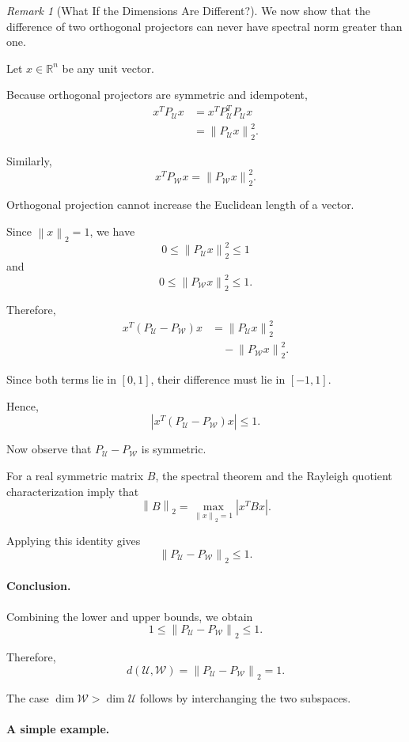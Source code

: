 \documentclass[14pt,letterpaper]{article}
\theoremstyle{plain}
\theoremstyle{definition}
\theoremstyle{remark}
\newtheorem{remark}[theorem]{Remark}
\newcommand{\R}{\mathbb{R}}
\newcommand{\norm}[1]{\left\lVert #1 \right\rVert}
\newcommand{\abs}[1]{\left| #1 \right|}
\begin{document}
\begin{remark}[What If the Dimensions Are Different?]
We now show that the difference of two
orthogonal projectors can never have
spectral norm greater than one.

Let $x\in\R^n$ be any unit vector.

Because orthogonal projectors are symmetric
and idempotent,
\[
\begin{aligned}
x^TP_{\mathcal U}x
&=x^TP_{\mathcal U}^TP_{\mathcal U}x\\
&=\norm{P_{\mathcal U}x}_2^2.
\end{aligned}
\]

Similarly,
\[
x^TP_{\mathcal W}x
=
\norm{P_{\mathcal W}x}_2^2.
\]

Orthogonal projection cannot increase
the Euclidean length of a vector.

Since $\norm{x}_2=1$, we have
\[
0\leq\norm{P_{\mathcal U}x}_2^2\leq1
\]
and
\[
0\leq\norm{P_{\mathcal W}x}_2^2\leq1.
\]

Therefore,
\[
\begin{aligned}
x^T(P_{\mathcal U}-P_{\mathcal W})x
&=
\norm{P_{\mathcal U}x}_2^2\\
&\quad-
\norm{P_{\mathcal W}x}_2^2.
\end{aligned}
\]

Since both terms lie in $[0,1]$,
their difference must lie in $[-1,1]$.

Hence,
\[
\boxed{
\abs{x^T(P_{\mathcal U}-P_{\mathcal W})x}
\leq1.
}
\]

Now observe that
$P_{\mathcal U}-P_{\mathcal W}$
is symmetric.

For a real symmetric matrix $B$,
the spectral theorem and the Rayleigh
quotient characterization imply that
\[
\norm{B}_2
=
\max_{\norm{x}_2=1}\abs{x^TBx}.
\]

Applying this identity gives
\[
\boxed{
\norm{P_{\mathcal U}-P_{\mathcal W}}_2
\leq1.
}
\]

\paragraph{Conclusion.}

Combining the lower and upper bounds,
we obtain
\[
1
\leq
\norm{P_{\mathcal U}-P_{\mathcal W}}_2
\leq1.
\]

Therefore,
\[
\boxed{
d(\mathcal U,\mathcal W)
=
\norm{P_{\mathcal U}-P_{\mathcal W}}_2
=1.
}
\]

The case
$\dim\mathcal W>\dim\mathcal U$
follows by interchanging the two
subspaces.

\paragraph{A simple example.}


\end{remark}
\end{document}
